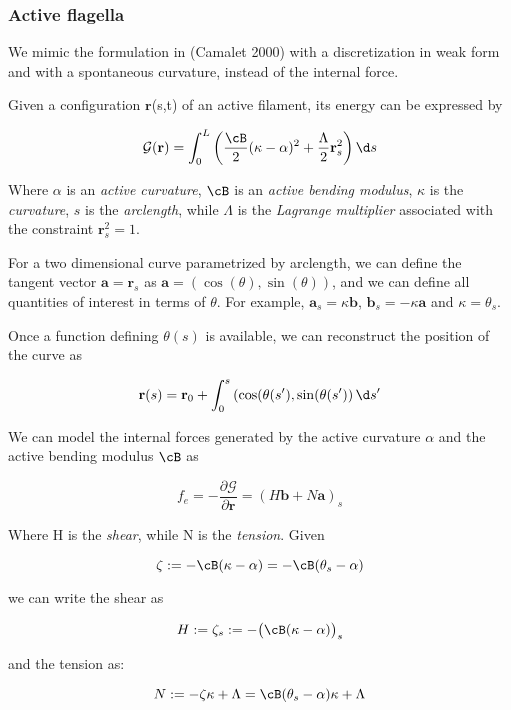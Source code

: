 
\subsubsection{Active flagella}
We mimic the formulation in (Camalet 2000) with a discretization in weak form and with a spontaneous curvature, instead of the internal force.




Given a configuration $\mathbf{r}$(s,t) of an active filament, its energy can be expressed by

\[\mathcal{G}(\mathbf{r}) = \int_0^L \left( \frac{\cB}{2}(\kappa-\alpha)^2 +
  \frac{\Lambda}{2} \mathbf{r}_s^2 \right) \d s\]

Where $\alpha$ is an \emph{active curvature}, $\cB$ is an \emph{active
  bending modulus}, $\kappa$ is the \emph{curvature}, $s$ is the
\emph{arclength}, while $\Lambda$ is the \emph{Lagrange multiplier}
associated with the constraint $\mathbf{r}_s^2 = 1$.

For a two dimensional curve parametrized by arclength, we can define
the tangent vector $\mathbf{a} = \mathbf{r}_s$ as $\mathbf{a} = (\cos(\theta), \sin(\theta))$, and
we can define all quantities of interest in terms of $\theta$. For
example, $\mathbf{a}_s = \kappa \mathbf{b}$, $\mathbf{b}_s = -\kappa \mathbf{a}$ and $\kappa = \theta_s$.

Once a function defining \(\theta(s)\) is available, we can reconstruct
the position of the curve as

\[\mathbf{r}(s) = \mathbf{r}_0 + \int_0^s \left(\cos(\theta(s'), \sin(\theta(s') \right)
\d s'\]

We can model the internal forces generated by the active curvature
$\alpha$ and the active bending modulus $\cB$ as

\[f_e = -\frac{\partial \mathcal{G}}{\partial \mathbf{r}} = (H \mathbf{b} + N \mathbf{a})_s\]

Where H is the \emph{shear}, while N is the
\emph{tension}. Given 

\[\zeta := -\cB(\kappa - \alpha) = -\cB(\theta_s - \alpha)\]

we can write the shear as

\[H := \zeta_s := -\big( \cB(\kappa - \alpha) \big)_s\]

and the tension as:

\[N := -\zeta\kappa + \Lambda = \cB(\theta_s-\alpha)\kappa +\Lambda\]

